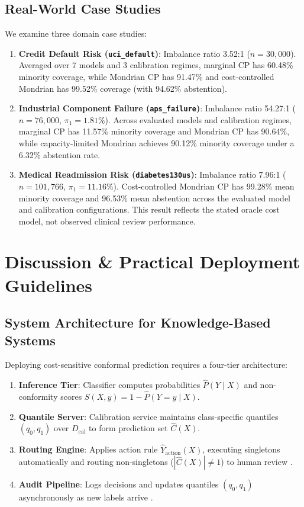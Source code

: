 \documentclass{ieeetj}
\providecommand{\FloatBarrier}{}
\begin{document}
\subsection{Real-World Case Studies}
We examine three domain case studies:
\begin{enumerate}
    \item \textbf{Credit Default Risk (\texttt{uci\_default})}: Imbalance ratio 3.52:1 ($n=30,000$). Averaged over 7 models and 3 calibration regimes, marginal CP has 60.48\% minority coverage, while Mondrian CP has 91.47\% and cost-controlled Mondrian has 99.52\% coverage (with 94.62\% abstention).
    \item \textbf{Industrial Component Failure (\texttt{aps\_failure})}: Imbalance ratio 54.27:1 ($n=76,000$, $\pi_1=1.81\%$). Across evaluated models and calibration regimes, marginal CP has 11.57\% minority coverage and Mondrian CP has 90.64\%, while capacity-limited Mondrian achieves 90.12\% minority coverage under a 6.32\% abstention rate.
    \item \textbf{Medical Readmission Risk (\texttt{diabetes130us})}: Imbalance ratio 7.96:1 ($n=101,766$, $\pi_1=11.16\%$). Cost-controlled Mondrian CP has 99.28\% mean minority coverage and 96.53\% mean abstention across the evaluated model and calibration configurations. This result reflects the stated oracle cost model, not observed clinical review performance.
\end{enumerate}

\FloatBarrier
\section{Discussion \& Practical Deployment Guidelines}
\label{sec:discussion}

\subsection{System Architecture for Knowledge-Based Systems}
\label{sec:architecture}
Deploying cost-sensitive conformal prediction requires a four-tier architecture:
\begin{enumerate}
    \item \textbf{Inference Tier}: Classifier computes probabilities $\hat{P}(Y \mid X)$ and non-conformity scores $S(X, y) = 1 - \hat{P}(Y=y \mid X)$.
    \item \textbf{Quantile Server}: Calibration service maintains class-specific quantiles $(q_0, q_1)$ over $D_{\mathrm{cal}}$ to form prediction set $\hat{C}(X)$.
    \item \textbf{Routing Engine}: Applies action rule $\hat{Y}_{\mathrm{action}}(X)$, executing singletons automatically and routing non-singletons ($|\hat{C}(X)| \neq 1$) to human review \cite{bhatt2021uncertainty, charoenphakdee2021rejection}.
    \item \textbf{Audit Pipeline}: Logs decisions and updates quantiles $(q_0, q_1)$ asynchronously as new labels arrive \cite{vovk2012conditional}.
\end{enumerate}
\end{document}
